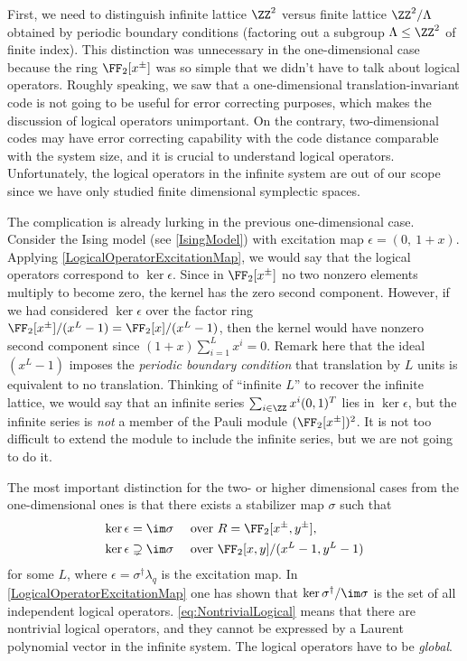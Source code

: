 First, we need to distinguish infinite lattice $\ZZ^2$
versus finite lattice $\ZZ^2 / \Lambda$ obtained by
periodic boundary conditions
(factoring out a subgroup $\Lambda \le \ZZ^2$ of finite index).
This distinction was unnecessary in the one-dimensional case
because the ring $\FF_2[x^\pm]$ was so simple
that we didn't have to talk about logical operators.
Roughly speaking, we saw that
a one-dimensional translation-invariant code
is not going to be useful for error correcting purposes,
which makes the discussion of logical operators unimportant.
On the contrary, 
two-dimensional codes may have error correcting capability
with the code distance comparable with the system size,
and it is crucial to understand logical operators.
Unfortunately,
the logical operators in the infinite system are
out of our scope since we have only studied finite dimensional symplectic spaces.

The complication is
already lurking in the previous one-dimensional case.
Consider the Ising model (see \ref{IsingModel}) 
with excitation map $\epsilon = (0, ~1+x )$.
Applying \ref{LogicalOperatorExcitationMap},
we would say that the logical operators correspond to $\ker \epsilon$.
Since in $\FF_2[x^\pm]$ no two nonzero elements multiply to become zero,
the kernel has the zero second component.
However, if we had considered $\ker \epsilon$ over the factor ring
$\FF_2[x^\pm] / (x^L -1) = \FF_2[x]/(x^L-1)$,
then the kernel would have nonzero second component 
since $(1+x)\sum_{i=1}^L x^i = 0$.
Remark here that the ideal $(x^L-1)$ imposes the \emph{periodic boundary condition}
that translation by $L$ units is equivalent to no translation.
Thinking of ``infinite $L$'' to recover the infinite lattice,
we would say that an infinite series $\sum_{i \in \ZZ} x^i (0,1)^T$ lies in $\ker \epsilon$,
but the infinite series is \emph{not} a member of the Pauli module $(\FF_2[x^\pm])^2$.
It is not too difficult to extend the module 
to include the infinite series, but we are not going to do it.

The most important distinction for the two- or higher dimensional
cases from the one-dimensional ones
is that there exists a stabilizer map $\sigma$ such that
\begin{align}
\ker \epsilon &= \im \sigma 
   \quad \text{ over } R = \FF_2[x^\pm, y^\pm], \label{eq:Exactness}\\
\ker \epsilon &\supsetneq \im \sigma
  \quad \text{ over } \FF_2[x,y]/(x^L-1,y^L-1) \label{eq:NontrivialLogical}
\end{align}
for some $L$, where $\epsilon = \sigma^\dagger \lambda_q$
is the excitation map.
In \ref{LogicalOperatorExcitationMap}
one has shown that $\ker \sigma^\dagger / \im \sigma$ 
is the set of all independent logical operators.
\eqref{eq:NontrivialLogical} means that there are
nontrivial logical operators,
and they cannot be expressed by a Laurent polynomial vector
in the infinite system.
The logical operators have to be \emph{global}.

